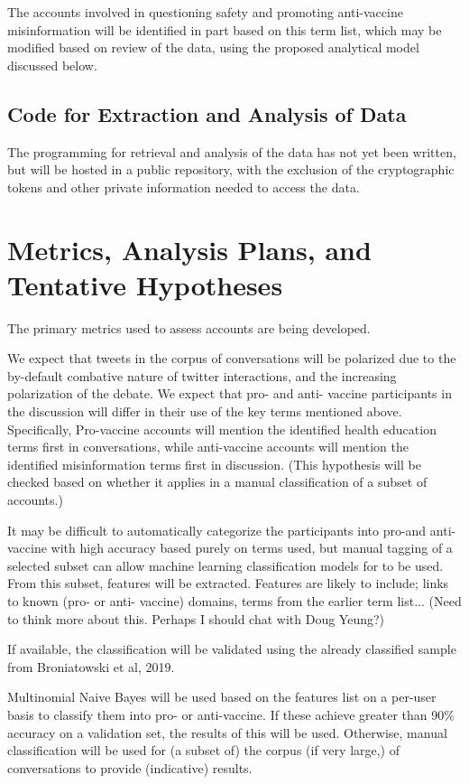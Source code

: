 \documentclass{article}
\begin{document}
The accounts involved in questioning safety and promoting anti-vaccine misinformation will be identified in part based on this term list, which may be modified based on review of the data, using the proposed analytical model discussed below.

\subsection{Code for Extraction and Analysis of Data}
The programming for retrieval and analysis of the data has not yet been written, but will be hosted in a public repository, with the exclusion of the cryptographic tokens and other private information needed to access the data.

\section{Metrics, Analysis Plans, and Tentative Hypotheses}

The primary metrics used to assess accounts are being developed.

We expect that tweets in the corpus of conversations will be polarized due to the by-default combative nature of twitter interactions, and the increasing polarization of the debate. We expect that pro- and anti- vaccine participants in the discussion will differ in their use of the key terms mentioned above. Specifically, Pro-vaccine accounts will mention the identified health education terms first in conversations, while anti-vaccine accounts will mention the identified misinformation terms first in discussion. (This hypothesis will be checked based on whether it applies in a manual classification of a subset of accounts.)

It may be difficult to automatically categorize the participants into pro-and anti-vaccine with high accuracy based purely on terms used, but manual tagging of a selected subset can allow machine learning classification models for to be used. From this subset, features will be extracted. Features are likely to include; links to known (pro- or anti- vaccine) domains, terms from the earlier term list... (Need to think more about this. Perhaps I should chat with Doug Yeung?)

If available, the classification will be validated using the already classified sample from Broniatowski et al, 2019.


Multinomial Naive Bayes will be used based on the features list on a per-user basis to classify them into pro- or anti-vaccine. If these achieve greater than 90\% accuracy on a validation set, the results of this will be used. Otherwise, manual classification will be used for (a subset of) the corpus (if very large,) of conversations to provide (indicative) results.
\end{document}
